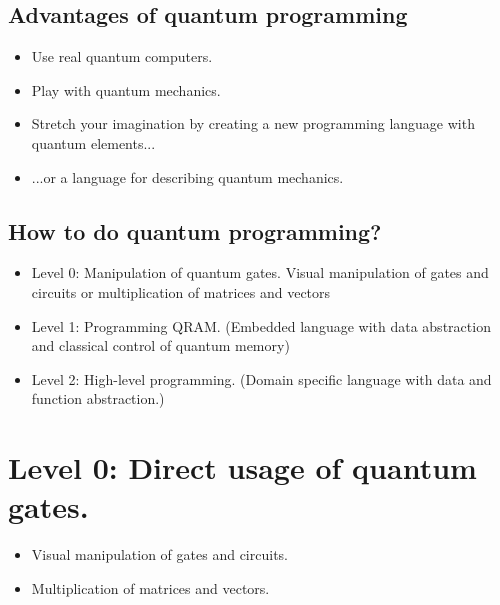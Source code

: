\documentclass[a4paper,11pt]{article}
\begin{document}
\subsection{Advantages of quantum programming}


\begin{itemize}
    \item Use real quantum computers. 
    \item Play with quantum mechanics.
    \item Stretch your imagination by creating a new programming 
    language with quantum elements...
    \item ...or a language for describing quantum mechanics.
\end{itemize}

\subsection{How to do quantum programming?}

\begin{itemize}
    \item  Level 0: Manipulation of quantum gates.
    Visual manipulation of gates and circuits or multiplication 
        of matrices and vectors
    
    \item Level 1: Programming QRAM. (Embedded language 
        with data abstraction and classical control of quantum memory)
    
    \item Level 2: High-level programming. (Domain specific 
        language with data and function abstraction.)
\end{itemize}

\section{Level 0: Direct usage of quantum gates.}

\begin{itemize}
\item Visual manipulation of gates and circuits.
\item Multiplication of matrices and vectors.
\end{itemize}
\end{document}
